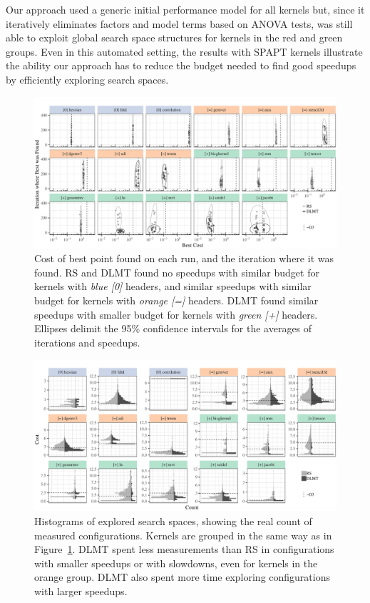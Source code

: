 \documentclass[conference]{IEEEtran}
\begin{document}
Our approach used a generic initial performance model for all kernels but,
since it iteratively eliminates factors and model terms based on ANOVA tests,
was still able to exploit global search space structures for kernels in the red
and green groups. Even in this automated setting, the results with SPAPT kernels
illustrate the ability our approach has to reduce the budget needed to find good
speedups by efficiently exploring search spaces.

\begin{figure}[p]
\centering
\includegraphics[width=\textwidth]{./img/iteration_best_comparison.pdf}
\caption{\label{fig:orgd2c6a45}
Cost of best point found on each run, and the iteration where it was found. RS and DLMT found no speedups with similar budget for kernels with \emph{blue [0]} headers, and similar speedups with similar budget for kernels with \emph{orange [=]} headers. DLMT found similar speedups with smaller budget for kernels with \emph{green [+]} headers. Ellipses delimit the 95\% confidence intervals for the averages of iterations and speedups.}
\end{figure}

\begin{figure}[p]
\centering
\includegraphics[width=\textwidth]{./img/split_histograms.pdf}
\caption{\label{fig:org2a17872}
Histograms of explored search spaces, showing the real count of measured configurations. Kernels are grouped in the same way as in Figure~\ref{fig:orgd2c6a45}. DLMT spent less measurements than RS in configurations with smaller speedups or with slowdowns, even for kernels in the orange group. DLMT also spent more time exploring configurations with larger speedups.}
\end{figure}
\end{document}
